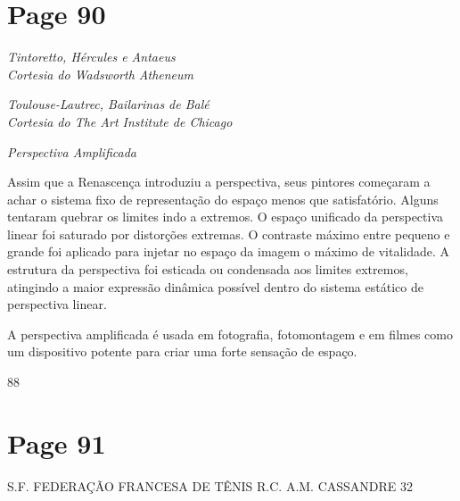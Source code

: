 \documentclass[a4paper]{article}
\begin{document}
\newpage
\section*{Page 90}

\begin{center}
\small\itshape
Tintoretto, Hércules e Antaeus\\
Cortesia do Wadsworth Atheneum
\end{center}

\vspace{1.5cm} 

\begin{center}
\small\itshape
Toulouse-Lautrec, Bailarinas de Balé\\
Cortesia do The Art Institute de Chicago
\end{center}

\vspace{3cm} 

\begin{center}
\normalfont\itshape
Perspectiva Amplificada
\end{center}

\vspace{0.7em} 

\noindent
Assim que a Renascença introduziu a perspectiva, seus pintores começaram a achar o sistema fixo de representação do espaço menos que satisfatório. Alguns tentaram quebrar os limites indo a extremos. O espaço unificado da perspectiva linear foi saturado por distorções extremas. O contraste máximo entre pequeno e grande foi aplicado para injetar no espaço da imagem o máximo de vitalidade. A estrutura da perspectiva foi esticada ou condensada aos limites extremos, atingindo a maior expressão dinâmica possível dentro do sistema estático de perspectiva linear.

\par 

A perspectiva amplificada é usada em fotografia, fotomontagem e em filmes como um dispositivo potente para criar uma forte sensação de espaço.

\vfill 

\begin{center}
88
\end{center}

\newpage
\section*{Page 91}

S.F. FEDERAÇÃO FRANCESA DE TÊNIS R.C.
A.M. CASSANDRE 32
\end{document}
